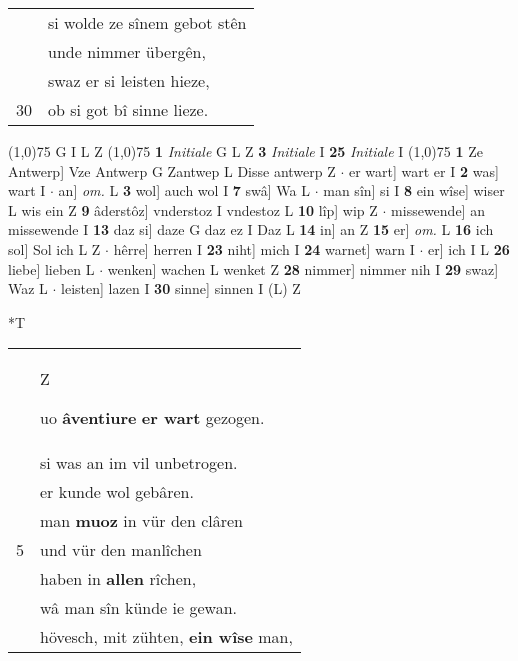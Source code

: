\documentclass[8pt,a4paper,notitlepage]{article}
\begin{document}
\begin{table}[ht]
\begin{minipage}[t]{0.5\linewidth}
\begin{tabular}{rl}
 & si wolde ze sînem gebot stên\\ 
 & unde nimmer übergên,\\ 
 & swaz er si leisten hieze,\\ 
30 & ob si got bî sinne lieze.\\ 
\end{tabular}
\scriptsize
\line(1,0){75} \newline
G I L Z \newline
\line(1,0){75} \newline
\textbf{1} \textit{Initiale} G L Z  \textbf{3} \textit{Initiale} I  \textbf{25} \textit{Initiale} I  \newline
\line(1,0){75} \newline
\textbf{1} Ze Antwerp] Vze Antwerp G Zantwep L Disse antwerp Z  $\cdot$ er wart] wart er I \textbf{2} was] wart I  $\cdot$ an] \textit{om.} L \textbf{3} wol] auch wol I \textbf{7} swâ] Wa L  $\cdot$ man sîn] si I \textbf{8} ein wîse] wiser L wis ein Z \textbf{9} âderstôz] vnderstoz I vndestoz L \textbf{10} lîp] wip Z  $\cdot$ missewende] an missewende I \textbf{13} daz si] daze G daz ez I Daz L \textbf{14} in] an Z \textbf{15} er] \textit{om.} L \textbf{16} ich sol] Sol ich L Z  $\cdot$ hêrre] herren I \textbf{23} niht] mich I \textbf{24} warnet] warn I  $\cdot$ er] ich I L \textbf{26} liebe] lieben L  $\cdot$ wenken] wachen L wenket Z \textbf{28} nimmer] nimmer nih I \textbf{29} swaz] Waz L  $\cdot$ leisten] lazen I \textbf{30} sinne] sinnen I (L) Z \newline
\end{minipage}
\hspace{0.5cm}
\begin{minipage}[t]{0.5\linewidth}
\small
\begin{center}*T
\end{center}
\begin{tabular}{rl}
 & \begin{large}Z\end{large}uo \textbf{âventiure} \textbf{er wart} gezogen.\\ 
 & si was an im vil unbetrogen.\\ 
 & er kunde wol gebâren.\\ 
 & man \textbf{muoz} in vür den clâren\\ 
5 & und vür den manlîchen\\ 
 & haben in \textbf{allen} rîchen,\\ 
 & wâ man sîn künde ie gewan.\\ 
 & hövesch, mit zühten, \textbf{ein wîse} man,\\ 

\end{tabular}
\end{minipage}
\end{table}
\end{document}
